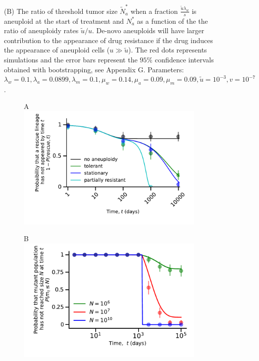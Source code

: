 \documentclass[12pt]{extarticle}
\begin{document}
\begin{figure}
{(B) The ratio of threshold tumor size $\tilde{N}_a^*$ when a fraction $\frac{\tilde{u}\lambda_w}{s}$ is aneuploid at the start of treatment and $N_a^*$ as a function of the the ratio of aneuploidy rates $\tilde{u}/u$. De-novo aneuploids will have larger contribution to the appearance of drug resistance if the drug induces the appearance of aneuploid cells ($u \gg \tilde u$). The red dots represents  simulations and the error bars represent the $95\%$ confidence intervals obtained with bootstrapping, see Appendix G. Parameters: $\lambda_w=0.1,\lambda_a=0.0899,\lambda_m=0.1,\mu_w=0.14,\mu_a=0.09,\mu_m=0.09,\tilde{u}=10^{-3}, v=10^{-7}$.
}
\label{rescue_denovo}
\end{figure}


\begin{figure}
\vspace*{1\baselineskip}
\begin{subfigure}{0.5\textwidth}
A\\
\includegraphics[width=1\textwidth]{Figures/ReboundProbability.pdf}
\end{subfigure}
\begin{subfigure}{0.5\textwidth}
B\\
\includegraphics[width=1\textwidth]{Figures/ProliferationTimeCDFN.pdf}

\end{subfigure}
\end{figure}
\end{document}
